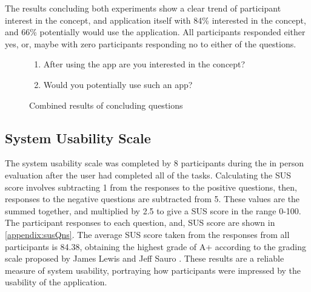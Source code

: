 The results concluding both experiments show a clear trend of participant interest in the concept, and application itself with 84\% interested in the concept, and 66\% potentially would use the application. All  participants responded either yes, or, maybe with zero participants responding no to either of the questions.


\begin{figure}[H]

\begin{enumerate}
    \item After using the app are you interested in the concept?
    \item Would you potentially use such an app?
\end{enumerate}
\caption{Combined results of concluding questions}
\label{fig:conclAns}
\end{figure}
\FloatBarrier

\subsection{System Usability Scale}
The system usability scale was completed by 8 participants during the in person evaluation after the user had completed all of the tasks. Calculating the SUS score involves subtracting 1 from the responses to the positive questions, then, responses to the negative questions are subtracted from 5. These values are the summed together, and multiplied by 2.5 to give a SUS score in the range 0-100. The participant responses to each question, and, SUS score are shown in \ref{appendix:susQns}. The average SUS score taken from the responses from all participants is 84.38, obtaining the highest grade of A+ according to the grading scale proposed by James Lewis and Jeff Sauro \cite{susGrades}. These results are a reliable measure of system usability, portraying how participants were impressed by the usability of the application.

